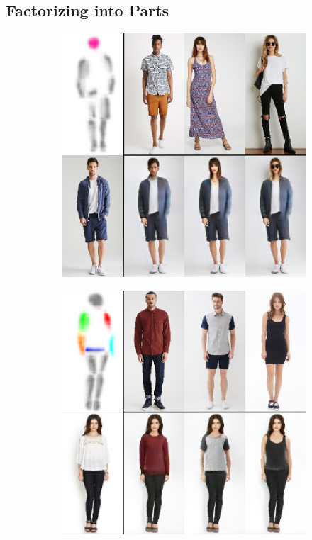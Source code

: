 	\subsection{Factorizing into Parts}
	\begin{figure}[t]
		\begin{subfigure}{0.24\linewidth}
		\centering
		\includegraphics[trim={0cm 0cm 0cm 0cm},clip, width=1.\linewidth]{fig/part_head}\caption{}
		\label{fig:part3_00}
		\end{subfigure}
		\begin{subfigure}{0.24\linewidth}
		\centering
		\includegraphics[trim={0cm 0cm 0cm 0cm},clip, width=1.\linewidth]{fig/part_body}\caption{}

\end{subfigure}
\end{figure}
